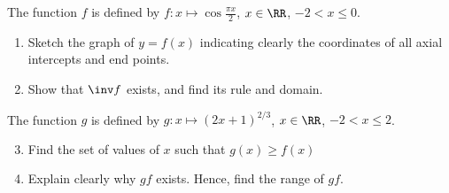 \begin{problem}
    The function $f$ is defined by $f : x \mapsto \cos \frac{\pi x}{2}$, $x \in \RR$, $-2 < x \leq 0$.

    \begin{enumerate}
        \item Sketch the graph of $y=f(x)$ indicating clearly the coordinates of all axial intercepts and end points.
        \item Show that $\inv f$ exists, and find its rule and domain.
    \end{enumerate}

    The function $g$ is defined by $g : x \mapsto (2x+1)^{2/3}$, $x \in \RR$, $-2 < x \leq 2$.

    \begin{enumerate}
        \setcounter{enumi}{2}
        \item Find the set of values of $x$ such that $g(x) \geq f(x)$
        \item Explain clearly why $gf$ exists. Hence, find the range of $gf$.
    \end{enumerate}
\end{problem}
\clearpage
